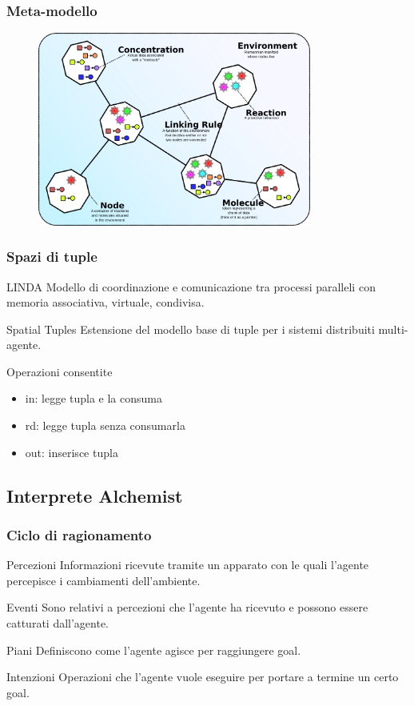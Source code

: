 \documentclass[handout]{beamer}\mode<presentation>{\usetheme{AMSCesenaBleu}}
\begin{document}
\begin{frame}
\frametitle{Meta-modello}
\begin{figure}
\includegraphics[width=9cm]{images/alchemistModel.png}
\end{figure}
\end{frame}

\begin{frame}
\frametitle{Spazi di tuple}
\begin{block}{LINDA}
Modello di coordinazione e comunicazione tra processi paralleli con memoria associativa, virtuale, condivisa.
\end{block}
\begin{block}{Spatial Tuples}
Estensione del modello base di tuple per i sistemi distribuiti multi-agente.
\vspace{0.2cm}

Operazioni consentite
\begin{itemize}
\item in: legge tupla e la consuma
\item rd: legge tupla senza consumarla
\item out: inserisce tupla
\end{itemize}
\end{block}
\end{frame}

\subsection{Interprete Alchemist}

\begin{frame}
\frametitle{Ciclo di ragionamento}
\begin{block}{Percezioni}
Informazioni ricevute tramite un apparato con le quali l'agente percepisce i cambiamenti dell'ambiente.
\end{block}

\begin{block}{Eventi}
Sono relativi a percezioni che l'agente ha ricevuto e possono essere catturati dall'agente.
\end{block}

\begin{block}{Piani}
Definiscono come l'agente agisce per raggiungere goal.
\end{block}

\begin{block}{Intenzioni}
Operazioni che l'agente vuole eseguire per portare a termine un certo goal.
\end{block}
\end{frame}
\end{document}
